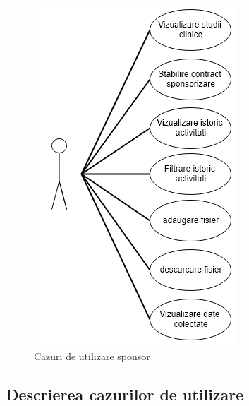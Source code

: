 \documentclass[12pt,a4paper,twoside]{report}
\begin{document}
	\begin{figure}[H]
		\begin{center}
			\includegraphics[scale=0.57]{img/uc_spon.PNG}
			\caption{Cazuri de utilizare sponsor}
  			\label{fig:ucs}
  		\end{center}
  	\end{figure}


\subsection{Descrierea cazurilor de utilizare}
  		
\end{document}
